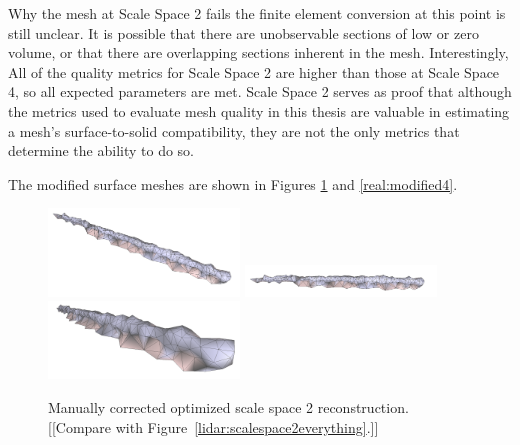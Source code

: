 \documentclass[12pt]{drexelthesis}
\begin{document}
Why the mesh at Scale Space 2 fails the finite element conversion at this point is still unclear. It is possible that there are unobservable sections of low or zero volume, or that there are overlapping sections inherent in the mesh. Interestingly, All of the quality metrics for Scale Space 2 are higher than those at Scale Space 4, so all expected parameters are met. Scale Space 2 serves as proof that although the metrics used to evaluate mesh quality in this thesis are valuable in estimating a mesh's surface-to-solid compatibility, they are not the only metrics that determine the ability to do so.

The modified surface meshes are shown in Figures \ref{real:modified2} and \ref{real:modified4}.

\begin{figure}[!ht]
	\centering
		\includegraphics[width=2in]{real-lab-scans/modmesh/scaleSpace2Modified00.png}
		\includegraphics[width=2in]{real-lab-scans/modmesh/scaleSpace2Modified01.png}
		\includegraphics[width=2in]{real-lab-scans/modmesh/scaleSpace2Modified02.png}
	\caption[Modified optimized surface mesh at scale space 2.]{\centering Manually corrected optimized scale space 2 reconstruction. [[Compare with Figure~\ref{lidar:scalespace2everything}.]]}
	\label{real:modified2}
\end{figure}
\end{document}

